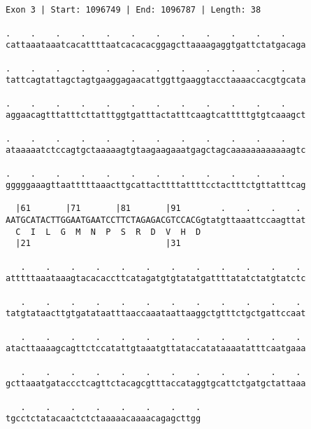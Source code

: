 \documentclass{article}
\begin{document}
\begin{Verbatim}
                                          
 
Exon 3 | Start: 1096749 | End: 1096787 | Length: 38
 
.    .    .    .    .    .    .    .    .    .    .    .    
cattaaataaatcacattttaatcacacacggagcttaaaagaggtgattctatgacaga
                                                            
.    .    .    .    .    .    .    .    .    .    .    .    
tattcagtattagctagtgaaggagaacattggttgaaggtacctaaaaccacgtgcata
                                                            
.    .    .    .    .    .    .    .    .    .    .    .    
aggaacagtttatttcttatttggtgatttactatttcaagtcatttttgtgtcaaagct
                                                            
.    .    .    .    .    .    .    .    .    .    .    .    
ataaaaatctccagtgctaaaaagtgtaagaagaaatgagctagcaaaaaaaaaaaagtc
                                                            
.    .    .    .    .    .    .    .    .    .    .    .    
gggggaaagttaatttttaaacttgcattacttttattttcctactttctgttatttcag
                                                            
  |61       |71       |81       |91        .    .    .    . 
AATGCATACTTGGAATGAATCCTTCTAGAGACGTCCACGgtatgttaaattccaagttat
  C  I  L  G  M  N  P  S  R  D  V  H  D                     
  |21                           |31                         
  
   .    .    .    .    .    .    .    .    .    .    .    . 
atttttaaataaagtacacaccttcatagatgtgtatatgattttatatctatgtatctc
                                                            
   .    .    .    .    .    .    .    .    .    .    .    . 
tatgtataacttgtgatataatttaaccaaataattaaggctgtttctgctgattccaat
                                                            
   .    .    .    .    .    .    .    .    .    .    .    . 
atacttaaaagcagttctccatattgtaaatgttataccatataaaatatttcaatgaaa
                                                            
   .    .    .    .    .    .    .    .    .    .    .    . 
gcttaaatgataccctcagttctacagcgtttaccataggtgcattctgatgctattaaa
                                                            
   .    .    .    .    .    .    .    .
tgcctctatacaactctctaaaaacaaaacagagcttgg
                                       

\end{Verbatim}
\end{document}
